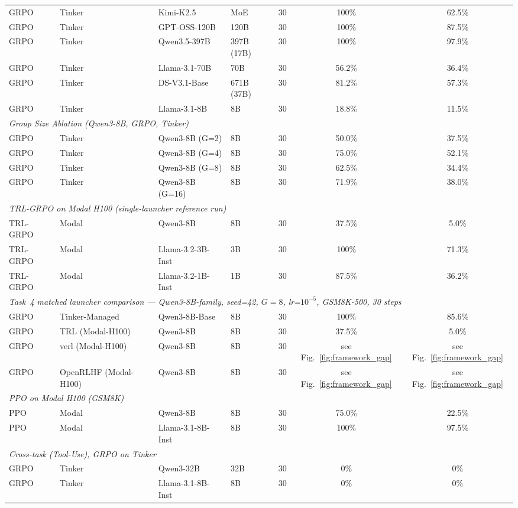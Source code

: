 \documentclass{article}
\begin{document}
\begin{table}[t]
\begin{tabular}{@{}l l l l r c c@{}}
GRPO & Tinker & Kimi-K2.5 & MoE & 30 & 100\% & 62.5\% \\
GRPO & Tinker & GPT-OSS-120B & 120B & 30 & 100\% & 87.5\% \\
GRPO & Tinker & Qwen3.5-397B & 397B (17B) & 30 & 100\% & 97.9\% \\
GRPO & Tinker & Llama-3.1-70B & 70B & 30 & 56.2\% & 36.4\% \\
GRPO & Tinker & DS-V3.1-Base & 671B (37B) & 30 & 81.2\% & 57.3\% \\
GRPO & Tinker & Llama-3.1-8B & 8B & 30 & 18.8\% & 11.5\% \\
\midrule
\multicolumn{7}{l}{\textit{Group Size Ablation (Qwen3-8B, GRPO, Tinker)}} \\
\midrule
GRPO & Tinker & Qwen3-8B (G=2) & 8B & 30 & 50.0\% & 37.5\% \\
GRPO & Tinker & Qwen3-8B (G=4) & 8B & 30 & 75.0\% & 52.1\% \\
GRPO & Tinker & Qwen3-8B (G=8) & 8B & 30 & 62.5\% & 34.4\% \\
GRPO & Tinker & Qwen3-8B (G=16) & 8B & 30 & 71.9\% & 38.0\% \\
\midrule
\multicolumn{7}{l}{\textit{TRL-GRPO on Modal H100 (single-launcher reference run)}} \\
\midrule
TRL-GRPO & Modal & Qwen3-8B & 8B & 30 & 37.5\% & 5.0\% \\
TRL-GRPO & Modal & Llama-3.2-3B-Inst & 3B & 30 & 100\% & 71.3\% \\
TRL-GRPO & Modal & Llama-3.2-1B-Inst & 1B & 30 & 87.5\% & 36.2\% \\
\midrule
\multicolumn{7}{l}{\textit{Task~4 matched launcher comparison --- Qwen3-8B-family, seed=42, $G=8$, lr=$10^{-5}$, GSM8K-500, 30 steps}} \\
\midrule
GRPO & Tinker-Managed & Qwen3-8B-Base & 8B & 30 & 100\% & 85.6\% \\
GRPO & TRL (Modal-H100) & Qwen3-8B & 8B & 30 & 37.5\% & 5.0\% \\
GRPO & verl (Modal-H100) & Qwen3-8B & 8B & 30 & see Fig.~\ref{fig:framework_gap} & see Fig.~\ref{fig:framework_gap} \\
GRPO & OpenRLHF (Modal-H100) & Qwen3-8B & 8B & 30 & see Fig.~\ref{fig:framework_gap} & see Fig.~\ref{fig:framework_gap} \\
\midrule
\multicolumn{7}{l}{\textit{PPO on Modal H100 (GSM8K)}} \\
\midrule
PPO & Modal & Qwen3-8B & 8B & 30 & 75.0\% & 22.5\% \\
PPO & Modal & Llama-3.1-8B-Inst & 8B & 30 & 100\% & 97.5\% \\
\midrule
\multicolumn{7}{l}{\textit{Cross-task (Tool-Use), GRPO on Tinker}} \\
\midrule
GRPO & Tinker & Qwen3-32B & 32B & 30 & 0\% & 0\% \\
GRPO & Tinker & Llama-3.1-8B-Inst & 8B & 30 & 0\% & 0\% \\
\bottomrule
\end{tabular}
\end{table}
\end{document}

